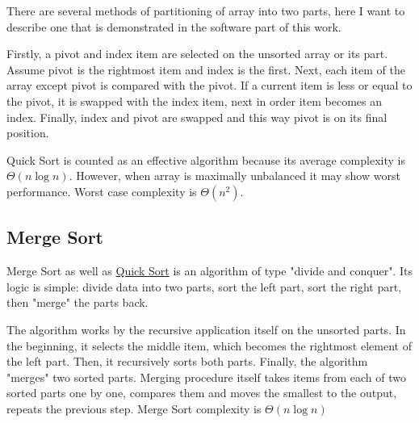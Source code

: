 \documentclass[
  field=inf,
  biblatex,
  language=english,
  glossaries,
  theorems=false,
  sourcecodes=false,
  index
]{kidiplom}
\begin{document}
There are several methods of partitioning of array into two parts, here I want to describe one that is demonstrated in the software part of this work.

Firstly, a pivot and index item are selected on the unsorted array or its part. Assume pivot is the rightmost item and index is the first. Next, each item of the array except pivot is compared with the pivot. If a current item is less or equal to the pivot, it is swapped with the index item, next in order item becomes an index. Finally, index and pivot are swapped and this way pivot is on its final position.

Quick Sort is counted as an effective algorithm because its average complexity is $\Theta(n \log n)$. However, when array is maximally unbalanced it may show worst performance. Worst case complexity is $\Theta(n^2)$.

\subsection{Merge Sort}
\label{sec:mergesort}

Merge Sort as well as \hyperref[sec:quicksort]{Quick Sort} is an algorithm of type "divide and conquer". Its logic is simple: divide data into two parts, sort the left part, sort the right part, then "merge" the parts back.

The algorithm works by the recursive application itself on the unsorted parts. In the beginning, it selects the middle item, which becomes the rightmost element of the left part. Then, it recursively sorts both parts. Finally, the algorithm "merges" two sorted parts. Merging procedure itself takes items from each of two sorted parts one by one, compares them and moves the smallest to the output, repeats the previous step. Merge Sort complexity is $\Theta(n \log n)$
\end{document}
